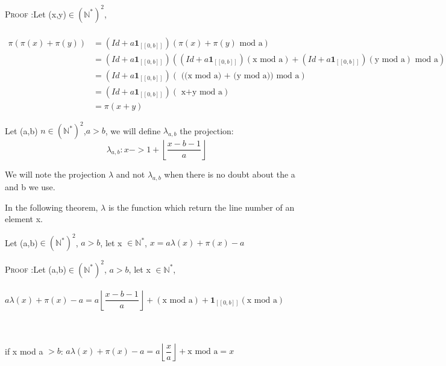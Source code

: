 \textsc{Proof :}Let (x,y)\(\in (\mathbb{N}^*)^2\),

\begin{align*}
 \\\pi(\pi(x)+\pi(y)) & = (Id+a\mathbf{1}_{ [\![0,b]\!]})(\pi(x)+\pi(y)\text{ mod a})\\
& = (Id+a\mathbf{1}_{ [\![0,b]\!]})((Id+a\mathbf{1}_{ [\![0,b]\!]})(\text{x mod a})+(Id+a\mathbf{1}_{ [\![0,b]\!]})(\text{y mod a})\text{ mod a}) \\
& = (Id+a\mathbf{1}_{ [\![0,b]\!]})(\text{ ((x mod a) + (y mod a)) mod a})\\
& =(Id+a\mathbf{1}_{ [\![0,b]\!]})(\text{ x+y mod a})\\
& =\pi(x+y)
\end{align*}


\begin{notation}

Let (a,b) \(n \in (\mathbb{N}^*)^2\),\(a>b\), we will define \(\lambda_{a,b}\) the projection:
\[ \lambda_{a,b}:x->1+ \left\lfloor\dfrac{x-b-1}{a}\right\rfloor\]
\end{notation}

We will note  the projection \(\lambda\) and not \(\lambda_{a,b}\) when there is no doubt about the a and b we use.

\begin{remark}
In the following theorem, \(\lambda\) is the function which return the line number of an element x.
\end{remark}

\begin{Proposition}
Let (a,b)\(\in (\mathbb{N}^*)^2\), \(a>b\), let x \(\in \mathbb{N}^*\), \(x=a\lambda(x)+\pi(x)-a\)
\end{Proposition}
\textsc{Proof :}Let (a,b)\(\in (\mathbb{N}^*)^2\), \(a>b\), let x \(\in \mathbb{N}^*\),
\\\\ \(a\lambda(x)+\pi(x)-a=a\left\lfloor\dfrac{x-b-1}{a}\right\rfloor+(\text{x mod a})+\mathbf{1}_{ [\![0,b]\!]}(\text{x mod a})\)

\\\\if x mod a \(>b\): \(a\lambda(x)+\pi(x)-a=a\left\lfloor\dfrac{x}{a}\right\rfloor+\text{x mod a}=x\)

